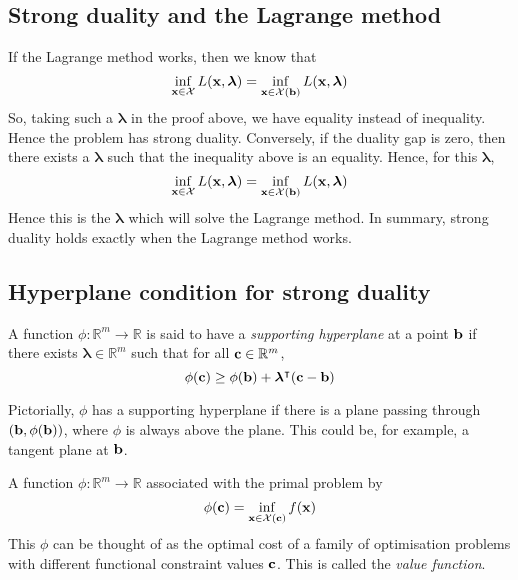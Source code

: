 \subsection{Strong duality and the Lagrange method}
If the Lagrange method works, then we know that
\[
	\inf_{\vb x \in \mathcal X} L(\vb x, \bm \lambda) = \inf_{\vb x \in \mathcal X(\vb b)} L(\vb x, \bm \lambda)
\]
So, taking such a \( \bm \lambda \) in the proof above, we have equality instead of inequality.
Hence the problem has strong duality.
Conversely, if the duality gap is zero, then there exists a \( \bm \lambda \) such that the inequality above is an equality.
Hence, for this \( \bm \lambda \),
\[
	\inf_{\vb x \in \mathcal X} L(\vb x, \bm \lambda) = \inf_{\vb x \in \mathcal X(\vb b)} L(\vb x, \bm \lambda)
\]
Hence this is the \( \bm \lambda \) which will solve the Lagrange method.
In summary, strong duality holds exactly when the Lagrange method works.

\subsection{Hyperplane condition for strong duality}
\begin{definition}
	A function \( \phi \colon \mathbb R^m \to \mathbb R \) is said to have a \textit{supporting hyperplane} at a point \( \vb b \) if there exists \( \bm \lambda \in \mathbb R^m \) such that for all \( \vb c \in \mathbb R^m \),
	\[
		\phi(\vb c) \geq \phi(\vb b) + \bm\lambda^\intercal (\vb c - \vb b)
	\]
\end{definition}
\noindent Pictorially, \( \phi \) has a supporting hyperplane if there is a plane passing through \( (\vb b, \phi(\vb b)) \), where \( \phi \) is always above the plane.
This could be, for example, a tangent plane at \( \vb b \).

\begin{definition}
	A function \( \phi \colon \mathbb R^m \to \mathbb R \) associated with the primal problem by
	\[
		\phi(\vb c) = \inf_{\vb x \in \mathcal X(\vb c)} f(\vb x)
	\]
	This \( \phi \) can be thought of as the optimal cost of a family of optimisation problems with different functional constraint values \( \vb c \).
	This is called the \textit{value function}.
\end{definition}

